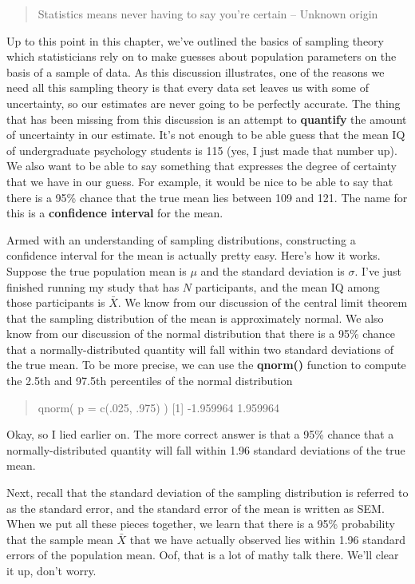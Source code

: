 \documentclass[]{book}
\begin{document}
\begin{quote}
Statistics means never having to say you're certain -- Unknown origin
\end{quote}

Up to this point in this chapter, we've outlined the basics of sampling theory which statisticians rely on to make guesses about population parameters on the basis of a sample of data. As this discussion illustrates, one of the reasons we need all this sampling theory is that every data set leaves us with some of uncertainty, so our estimates are never going to be perfectly accurate. The thing that has been missing from this discussion is an attempt to \textbf{quantify} the amount of uncertainty in our estimate. It's not enough to be able guess that the mean IQ of undergraduate psychology students is 115 (yes, I just made that number up). We also want to be able to say something that expresses the degree of certainty that we have in our guess. For example, it would be nice to be able to say that there is a 95\% chance that the true mean lies between 109 and 121. The name for this is a \textbf{confidence interval} for the mean.

Armed with an understanding of sampling distributions, constructing a confidence interval for the mean is actually pretty easy. Here's how it works. Suppose the true population mean is \(\mu\) and the standard deviation is \(\sigma\). I've just finished running my study that has \(N\) participants, and the mean IQ among those participants is \(\bar{X}\). We know from our discussion of the central limit theorem that the sampling distribution of the mean is approximately normal. We also know from our discussion of the normal distribution that there is a 95\% chance that a normally-distributed quantity will fall within two standard deviations of the true mean. To be more precise, we can use the \textbf{qnorm()} function to compute the 2.5th and 97.5th percentiles of the normal distribution

\begin{quote}
qnorm( p = c(.025, .975) ) {[}1{]} -1.959964 1.959964
\end{quote}

Okay, so I lied earlier on. The more correct answer is that a 95\% chance that a normally-distributed quantity will fall within 1.96 standard deviations of the true mean.

Next, recall that the standard deviation of the sampling distribution is referred to as the standard error, and the standard error of the mean is written as SEM. When we put all these pieces together, we learn that there is a 95\% probability that the sample mean \(\bar{X}\) that we have actually observed lies within 1.96 standard errors of the population mean. Oof, that is a lot of mathy talk there. We'll clear it up, don't worry.
\end{document}
